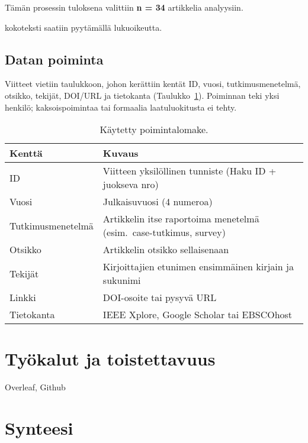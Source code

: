 \documentclass[bscthesis,finnish,oneside,biblatex]{uefcsthesis}
\begin{document}
Tämän prosessin tuloksena valittiin \textbf{n = 34} artikkelia analyysiin.

\cite{ozdenizci2024mobilizing} kokoteksti saatiin pyytämällä lukuoikeutta.

\subsection{Datan poiminta}
\label{sec:data-extraction}

Viitteet vietiin taulukkoon, johon kerättiin kentät
ID, vuosi, tutkimusmenetelmä, otsikko, tekijät, DOI/URL ja tietokanta
(Taulukko~\ref{tab:extractionfields}). Poiminnan teki yksi henkilö;
kaksoispoimintaa tai formaalia laatuluokitusta ei tehty.


\begin{table}[htbp]
  \centering
  \footnotesize
  \caption{Käytetty poimintalomake.}
  \label{tab:extractionfields}
  \begin{tabular}{p{3cm}p{8.5cm}}
    \toprule
    \textbf{Kenttä} & \textbf{Kuvaus} \\
    \midrule
    ID           & Viitteen yksilöllinen tunniste (Haku ID + juokseva nro) \\
    Vuosi        & Julkaisuvuosi (4 numeroa) \\
    Tutkimus\-menetelmä & Artikkelin itse raportoima menetelmä (esim.\ case-tutkimus, survey) \\
    Otsikko      & Artikkelin otsikko sellaisenaan \\
    Tekijät      & Kirjoittajien etunimen ensimmäinen kirjain ja sukunimi \\
    Linkki       & DOI-osoite tai pysyvä URL \\
    Tietokanta   & IEEE Xplore, Google Scholar tai EBSCOhost \\
    \bottomrule
  \end{tabular}
\end{table}


\section{Työkalut ja toistettavuus}
\label{sec:tools}
Overleaf, Github

\section{Synteesi}
\label{sec:synthesis}
\end{document}
